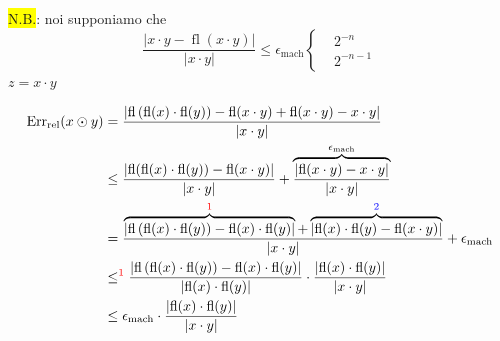 \documentclass{article}
\begin{document}
\colorbox{yellow}{N.B.}: noi supponiamo che $$
    \frac{\left|x\cdot y-\operatorname{fl}(x\cdot y)\right|}{\left|x\cdot y\right|}\le\epsilon_{\text{mach}}
    \begin{cases}
         & 2^{-n}   \\
         & 2^{-n-1}
    \end{cases}
$$
$z=x\cdot y$

\begin{align*}
    \operatorname{Err}_{\mathrm{rel}}(x\odot y) & =\frac{\left|\operatorname{fl}\left(\operatorname{fl}(x)\cdot\operatorname{fl}(y)\right)-\operatorname{fl}(x\cdot y)+\operatorname{fl}(x\cdot y)-x\cdot y\right|}{\left|x\cdot y\right|}                                                                                                                                                                 \\
                                                & \le\frac{\left|\operatorname{fl}(\operatorname{fl}(x)\cdot\operatorname{fl}(y))-\operatorname{fl}(x\cdot y)\right|}{\left|x\cdot y\right|}+\overbrace{\frac{\left|\operatorname{fl}(x\cdot y)-x\cdot y\right|}{\left|x\cdot y\right|}}^{\epsilon_{\mathrm{mach}}}                                                                                        \\
                                                & =\frac{\overbrace{\left|\operatorname{fl}\left(\operatorname{fl}(x)\cdot\operatorname{fl}(y)\right)-\operatorname{fl}(x)\cdot\operatorname{fl}(y)\right|}^{\textcolor{red}{1}}+\overbrace{\left|\operatorname{fl}(x)\cdot\operatorname{fl}(y)-\operatorname{fl}(x\cdot y)\right|}^{\textcolor{blue}{2}}}{\left|x\cdot y\right|}+\epsilon_{\mathrm{mach}} \\
                                                & \le^{\textcolor{red}{1}}\frac{\left|\operatorname{fl}\left(\operatorname{fl}(x)\cdot\operatorname{fl}(y)\right)-\operatorname{fl}(x)\cdot\operatorname{fl}(y)\right|}{\left|\operatorname{fl}(x)\cdot\operatorname{fl}(y)\right|}\cdot\frac{\left|\operatorname{fl}(x)\cdot\operatorname{fl}(y)\right|}{\left|x\cdot y\right|}                           \\
                                                & \le \epsilon_{\mathrm{mach}}\cdot \frac{\left|\operatorname{fl}(x)\cdot\operatorname{fl}(y)\right|}{\left|x\cdot y\right|}                                                                                                                                                                                                                               \\

\end{align*}
\end{document}
